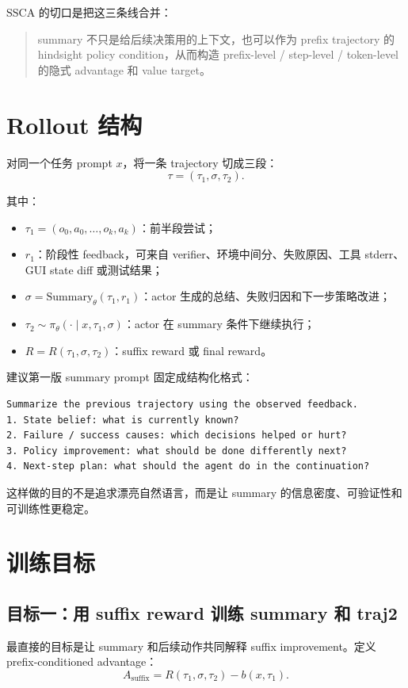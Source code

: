 \documentclass[10pt]{ctexart}
\begin{document}
SSCA 的切口是把这三条线合并：
\begin{quote}
summary 不只是给后续决策用的上下文，也可以作为 prefix trajectory 的 hindsight policy condition，从而构造 prefix-level / step-level / token-level 的隐式 advantage 和 value target。
\end{quote}

\section{Rollout 结构}
对同一个任务 prompt $x$，将一条 trajectory 切成三段：
\begin{equation}
  \tau = (\tau_1,\sigma,\tau_2).
\end{equation}

其中：
\begin{itemize}
  \item $\tau_1=(o_0,a_0,\ldots,o_k,a_k)$：前半段尝试；
  \item $r_1$：阶段性 feedback，可来自 verifier、环境中间分、失败原因、工具 stderr、GUI state diff 或测试结果；
  \item $\sigma=\mathrm{Summary}_\theta(\tau_1,r_1)$：actor 生成的总结、失败归因和下一步策略改进；
  \item $\tau_2\sim\pi_\theta(\cdot\mid x,\tau_1,\sigma)$：actor 在 summary 条件下继续执行；
  \item $R=R(\tau_1,\sigma,\tau_2)$：suffix reward 或 final reward。
\end{itemize}

建议第一版 summary prompt 固定成结构化格式：
\begin{lstlisting}
Summarize the previous trajectory using the observed feedback.
1. State belief: what is currently known?
2. Failure / success causes: which decisions helped or hurt?
3. Policy improvement: what should be done differently next?
4. Next-step plan: what should the agent do in the continuation?
\end{lstlisting}

这样做的目的不是追求漂亮自然语言，而是让 summary 的信息密度、可验证性和可训练性更稳定。

\section{训练目标}
\subsection{目标一：用 suffix reward 训练 summary 和 traj2}
最直接的目标是让 summary 和后续动作共同解释 suffix improvement。定义 prefix-conditioned advantage：
\begin{equation}
  A_{\mathrm{suffix}} = R(\tau_1,\sigma,\tau_2) - b(x,\tau_1).
\end{equation}
\end{document}
